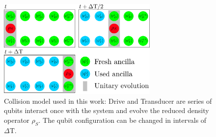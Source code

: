 \begin{figure}
	\centering
	\includegraphics[width=0.7\textwidth]{img/collision_model}
	\caption{Collision model used in this work: Drive and Transducer are series of qubits interact once with the system and evolve the reduced density operator $\rho_S$. The qubit configuration can be changed in intervals of $\Delta \mathrm{T}$.}
	\label{collmodel}
\end{figure}